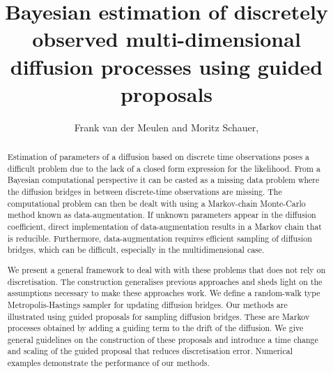\documentclass[preprint]{imsart}
\theoremstyle{definition}
\begin{document}
\begin{frontmatter}

\title{Bayesian estimation of  discretely observed  multi-dimensional diffusion processes using guided proposals}


\begin{aug}
\author{Frank van der Meulen and
Moritz Schauer, }







\address{Delft Institute of Applied Mathematics (DIAM) \\
Delft University of Technology\\
Mekelweg 4\\
2628 CD Delft\\
The Netherlands\\
\\[1em]
Mathematical Institute\\
Leiden University\\
P.O. Box 9512\\
2300 RA Leiden\\
The Netherlands\\
}


\end{aug}


\begin{abstract}


Estimation of parameters of a diffusion based on discrete time observations poses a difficult problem due to the lack of a closed form expression for the likelihood. From a Bayesian computational perspective it can be casted as a missing data problem where the diffusion bridges in between discrete-time observations are missing. The computational problem can then be dealt with using a Markov-chain Monte-Carlo method known as  data-augmentation.
If unknown parameters appear in the diffusion coefficient, direct implementation of data-augmentation results in a Markov chain that is reducible. Furthermore, data-augmentation requires  efficient sampling of diffusion bridges, which can be difficult, especially in the multidimensional case.

We present a general framework to deal with with these problems that does not rely on discretisation.  The construction generalises previous approaches and sheds light on the assumptions necessary to make these approaches work. We define a random-walk type Metropolis-Hastings sampler for updating diffusion bridges. Our methods are illustrated  using guided proposals for sampling diffusion bridges. These are Markov processes obtained by adding a guiding term to the drift of the diffusion. We give  general guidelines on the construction of these proposals and  introduce a time change and scaling of the guided proposal  that reduces discretisation error. Numerical  examples demonstrate the performance of our methods.


\end{abstract}
\end{frontmatter}
\end{document}
